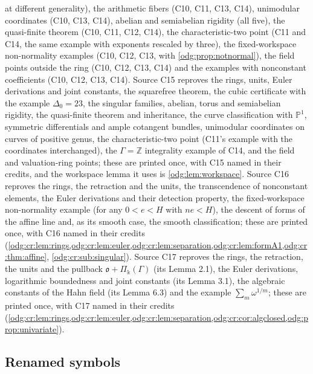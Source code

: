\documentclass[11pt,oneside]{article}
\numberwithin{equation}{section}
\theoremstyle{definition}
\theoremstyle{remark}
\newcommand{\Z}{\mathbb Z}
\newcommand{\crP}{\Pi_\Bbbk(\Gamma)}
\begin{document}
at different generality), the arithmetic fibers (C10, C11, C13, C14), unimodular
coordinates (C10, C13, C14), abelian and semiabelian rigidity (all five), the
quasi-finite theorem (C10, C11, C12, C14), the characteristic-two point (C11 and C14,
the same example with exponents rescaled by three), the fixed-workspace non-normality
examples (C10, C12, C13, with \cref{odg:prop:notnormal}), the field points outside the
ring (C10, C12, C13, C14) and the examples with nonconstant coefficients (C10, C12, C13,
C14). Source C15 reproves the rings, units, Euler derivations and joint constants, the
squarefree theorem, the cubic certificate with the example $\Delta_0=23$, the singular
families, abelian, torus and semiabelian rigidity, the quasi-finite theorem and
inheritance, the curve classification with $\mathbb P^1$, symmetric differentials and ample
cotangent bundles, unimodular coordinates on curves of positive genus, the
characteristic-two point (C11's example with the coordinates interchanged), the
$\Gamma=\Z$ integrality example of C14, and the field and valuation-ring points; these are
printed once, with C15 named in their credits, and the workspace lemma it uses is
\cref{odg:lem:workspace}. Source C16 reproves the rings, the retraction and the units,
the transcendence of nonconstant elements, the Euler derivations and their detection
property, the fixed-workspace non-normality example (for any $0<e<H$ with $ne<H$), the
descent of forms of the affine line and, as its smooth case, the smooth classification;
these are printed once, with C16 named in their credits
(\cref{odg:cr:lem:rings,odg:cr:lem:euler,odg:cr:lem:separation,odg:cr:lem:formA1,odg:cr:thm:affine},
\cref{odg:cr:sub:singular}).
Source C17 reproves the rings, the retraction, the units and the pullback
$\mathfrak o+\crP$ (its Lemma 2.1), the Euler derivations, logarithmic boundedness and
joint constants (its Lemma 3.1), the algebraic constants of the Hahn field (its Lemma 6.3)
and the example $\sum_m\omega^{1/m}$; these are printed once, with C17 named in their
credits
(\cref{odg:cr:lem:rings,odg:cr:lem:euler,odg:cr:lem:separation,odg:cr:cor:algclosed,odg:prop:univariate}).

\subsection{Renamed symbols}
\end{document}
